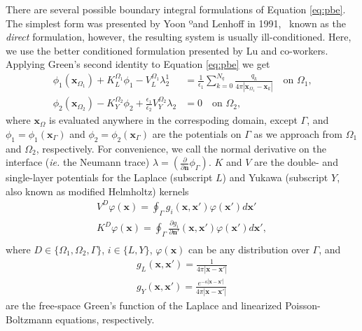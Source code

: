 There are several possible boundary integral formulations of Equation \eqref{eq:pbe}.~\cite{search2022towards} The simplest form was presented by Yoon ºand Lenhoff in 1991,~\cite{YoonLenhoff1990} known as the \emph{direct} formulation, however, the resulting system is usually ill-conditioned. Here, we use the better conditioned formulation presented by Lu and co-workers.~\cite{LuETal2006,LuETal2009,debuhr2016dashmm}
Applying Green's second identity to Equation \eqref{eq:pbe} we get 
%
\begin{align} \label{eq:volume_potential}
\phi_{1}(\mathbf{x}_{\Omega_1})+ K_{L}^{\Omega_1}\phi_1 -  V_{L}^{\Omega_1} \lambda_2^1 & = \tfrac{1}{\epsilon_1} \sum_{k=0}^{N_q}  \frac{q_k}{4\pi|\mathbf{x}_{\Omega_1} - \mathbf{x}_k|}  \quad \text{on $\Omega_1$,} \nonumber \\
\phi_{2}(\mathbf{x}_{\Omega_2}) - K_{Y}^{\Omega_2}\phi_2 + \tfrac{\epsilon_1}{\epsilon_2}  V_{Y}^{\Omega_2} \lambda_2& = 0 \quad \text{on $\Omega_2$,}
\end{align}
%
where $\mathbf{x}_\Omega$ is evaluated anywhere in the correspoding domain, except $\Gamma$, and $\phi_1 = \phi_1(\mathbf{x}_\Gamma)$ and $\phi_2 = \phi_2(\mathbf{x}_\Gamma)$ are the potentials on $\Gamma$ as we approach from $\Omega_1$ and $\Omega_2$, respectively. For convenience, we call the normal derivative on the interface ({\it ie.} the Neumann trace) $\lambda=\left(\frac{\partial}{\partial \mathbf{n}}  \phi_{\Gamma}  \right)$. $K$ and $V$ are the double- and single-layer potentials for the Laplace (subscript $L$) and Yukawa (subscript $Y$, also known as modified Helmholtz) kernels
%
\begin{align}\label{eq:single_double}
V^D \varphi (\mathbf{x}) = \oint_\Gamma g_i(\mathbf{x},\mathbf{x}')\varphi(\mathbf{x}')d\mathbf{x}'\nonumber\\
K^D \varphi (\mathbf{x}) = \oint_\Gamma \frac{\partial g_i}{\partial\mathbf{n}'}(\mathbf{x},\mathbf{x}')\varphi(\mathbf{x}')d\mathbf{x}',\nonumber\\
\end{align}
%
where $D \in \{\Omega_1, \Omega_2, \Gamma\}$, $i \in \{L,Y\}$, $\varphi(\mathbf{x})$ can be any distribution over $\Gamma$, and 
%
\begin{align}\label{eq:green_func}
g_L(\mathbf{x},\mathbf{x}')=\frac{1}{4\pi|\mathbf{x}-\mathbf{x}'|} \nonumber \\
g_Y(\mathbf{x},\mathbf{x}')=\frac{e^{-\kappa|\mathbf{x}-\mathbf{x}'|}}{4\pi|\mathbf{x}-\mathbf{x}'|}
\end{align}
%
are the free-space Green's function of the Laplace and linearized Poisson-Boltzmann equations, respectively. 

